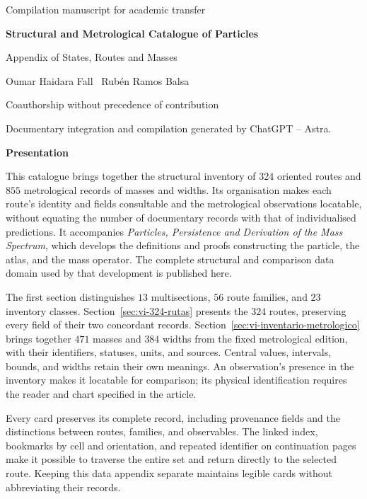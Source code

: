 \documentclass[a4paper,10pt]{article}
\begin{document}
\thispagestyle{empty}
\begin{center}
{\fontsize{8}{10}\selectfont Compilation manuscript for academic transfer\par}
\vspace{12mm}
{\fontsize{17}{20.5}\selectfont\bfseries Structural and Metrological Catalogue of Particles\par}
\vspace{6pt}
{\fontsize{11}{13.5}\selectfont Appendix of States, Routes and Masses\par}
\vspace{11pt}
{\fontsize{11.5}{14}\selectfont Oumar Haidara Fall \textperiodcentered\ Rubén Ramos Balsa\par}
\vspace{4pt}
{\fontsize{8}{10}\selectfont Coauthorship without precedence of contribution\par}
\vspace{3pt}
{\fontsize{7.5}{9.5}\selectfont Documentary integration and compilation generated by ChatGPT -- Astra.\par}
\end{center}
\vspace{7pt}
\begin{center}\bfseries Presentation\end{center}
\begingroup
\fontsize{10.5}{12.8}\selectfont
\setlength{\parskip}{2pt plus 1pt minus .5pt}
\noindent
\begin{minipage}{\textwidth}
This catalogue brings together the structural inventory of \(324\)
oriented routes and \(855\) metrological records of masses and widths.
Its organisation makes each route's identity and fields consultable and
the metrological observations locatable, without equating the number of documentary records
with that of individualised predictions. It accompanies \emph{Particles,
Persistence and Derivation of the Mass Spectrum}, which develops the
definitions and proofs constructing the particle, the atlas, and the
mass operator. The complete structural and comparison data domain used
by that development is published here.

The first section distinguishes \(13\) multisections, \(56\) route
families, and \(23\) inventory classes.
Section~\ref{sec:vi-324-rutas} presents the \(324\) routes, preserving
every field of their two concordant records.
Section~\ref{sec:vi-inventario-metrologico} brings together \(471\) masses
and \(384\) widths from the fixed metrological edition, with their
identifiers, statuses, units, and sources. Central values, intervals,
bounds, and widths retain their own meanings. An observation's presence
in the inventory makes it locatable for comparison; its physical
identification requires the reader and chart specified in the article.

Every card preserves its complete record, including provenance fields
and the distinctions between routes, families, and observables. The
linked index, bookmarks by cell and orientation, and repeated identifier
on continuation pages make it possible to traverse the entire set and
return directly to the selected route. Keeping this data appendix
separate maintains legible cards without abbreviating their records.\par
\end{minipage}
\par\endgroup
\clearpage
\tableofcontents
\clearpage



\end{document}
